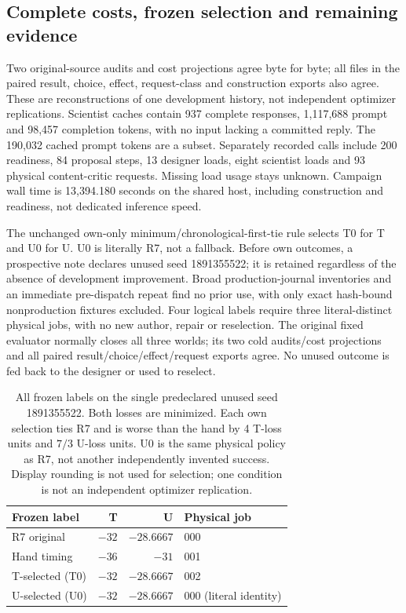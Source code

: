 \subsection{Complete costs, frozen selection and remaining evidence}
Two original-source audits and cost projections agree byte for byte; all
files in the paired result, choice, effect, request-class and construction
exports also agree. These are reconstructions of one development history,
not independent optimizer replications. Scientist caches contain 937 complete
responses, 1,117,688 prompt and 98,457 completion tokens, with no input lacking
a committed reply. The 190,032 cached prompt tokens are a subset. Separately
recorded calls include 200 readiness, 84 proposal steps, 13 designer loads,
eight scientist loads and 93 physical content-critic requests. Missing load
usage stays unknown. Campaign wall time is 13,394.180 seconds on the shared
host, including construction and readiness, not dedicated inference speed.

The unchanged own-only minimum/chronological-first-tie rule selects T0 for T
and U0 for U. U0 is literally R7, not a fallback. Before own outcomes, a
prospective note declares unused seed 1891355522; it is retained regardless
of the absence of development improvement. Broad production-journal inventories
and an immediate pre-dispatch repeat find no prior use, with only exact
hash-bound nonproduction fixtures excluded. Four logical labels require three
literal-distinct physical jobs, with no new author, repair or reselection.
The original fixed evaluator normally closes all three worlds; its two cold
audits/cost projections and all paired result/choice/effect/request exports
agree. No unused outcome is fed back to the designer or used to reselect.

\begin{table}[htbp]
\centering\small
\begin{tabular}{lrrl}
\toprule
Frozen label & T & U & Physical job\\
\midrule
R7 original & $-32$ & $-28.6667$ & 000\\
Hand timing & $-36$ & $-31$ & 001\\
T-selected (T0) & $-32$ & $-28.6667$ & 002\\
U-selected (U0) & $-32$ & $-28.6667$ & 000 (literal identity)\\
\bottomrule
\end{tabular}
\caption{All frozen labels on the single predeclared unused seed 1891355522.
Both losses are minimized. Each own selection ties R7 and is worse than the
hand by 4 T-loss units and $7/3$ U-loss units. U0 is the same physical policy
as R7, not another independently invented success. Display rounding is not
used for selection; one condition is not an independent optimizer replication.}
\label{tab:actual-staged-fixed}
\end{table}

